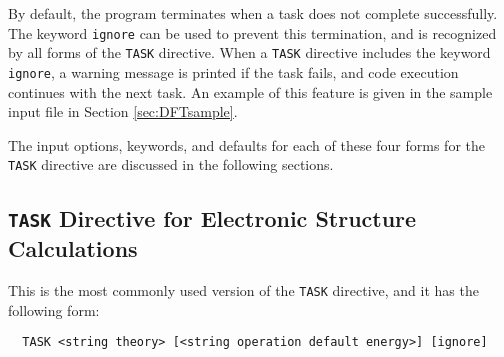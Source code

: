 By default, the program terminates when a task does not complete
successfully.  The keyword \verb+ignore+ can be used to prevent this
termination, and is recognized by all forms of the \verb+TASK+
directive.  When a \verb+TASK+ directive includes the keyword
\verb+ignore+, a warning message is printed if the task fails, and
code execution continues with the next task. An example of this feature
is given in the sample input file 
in Section \ref{sec:DFTsample}.

The input options, keywords, and defaults for each of these four forms
for the \verb+TASK+ directive are discussed in the following sections.

\subsection{{\tt TASK} Directive for Electronic Structure Calculations}
\label{sec:first_task}

This is the most commonly used version of the \verb+TASK+ directive, and
it has the following form:

\begin{verbatim}
  TASK <string theory> [<string operation default energy>] [ignore]
\end{verbatim}

